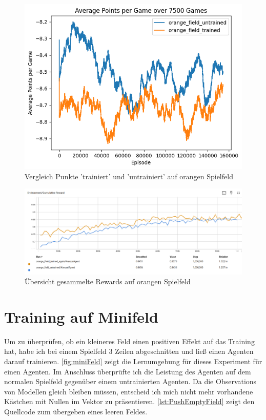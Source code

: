 \begin{figure}[!h]
    \centering
    \includegraphics[scale=0.6]{Bilder/points_orange_field.png}
    \caption{Vergleich Punkte 'trainiert' und 'untrainiert' auf orangen Spielfeld}
    \label{fig:orange_points}
\end{figure}
\begin{figure}[!h]
    \centering
    \includegraphics[scale=0.3]{Bilder/rewards_orange_field.png}
    \caption{Übersicht gesammelte Rewards auf orangen Spielfeld}
    \label{fig:orange_rewards}

\end{figure}

\newpage
\section{Training auf Minifeld}
Um zu überprüfen, ob ein kleineres Feld  einen positiven Effekt auf das Training hat, habe ich bei einem Spielfeld 3 Zeilen abgeschnitten und ließ einen Agenten darauf trainieren. \ref{fig:miniFeld} zeigt die Lernumgebung für dieses Experiment für einen Agenten.
Im Anschluss überprüfte ich die Leistung des Agenten auf dem normalen Spielfeld gegenüber einem untrainierten Agenten. Da die Observations von Modellen gleich bleiben müssen, entscheid ich mich nicht mehr vorhandene Kästchen mit Nullen im Vektor zu präsentieren. \ref{lst:PushEmptyField} zeigt den Quellcode zum übergeben eines leeren Feldes.

